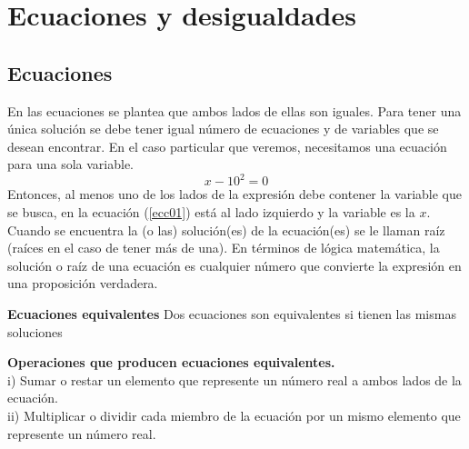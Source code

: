\chapter{Ecuaciones y desigualdades}
\label{EyD}

\section{Ecuaciones}
\label{ecc0}

En las ecuaciones se plantea que ambos lados de ellas son iguales. Para tener una única solución se debe tener igual número de ecuaciones y de variables que se desean encontrar. En el caso particular que veremos, necesitamos una ecuación para una sola variable.\\
\begin{equation}
x-10^{2}=0 \label{ecc01}
\end{equation} 
Entonces, al menos uno de los lados de la expresión debe contener la variable que se busca, en la ecuación (\ref{ecc01}) está al lado izquierdo y la variable es la $x$. Cuando se encuentra la (o las) solución(es) de la ecuación(es) se le llaman raíz (raíces en el caso de tener más de una). En términos de lógica matemática, la solución o raíz de una ecuación es cualquier número que convierte la expresión en una proposición verdadera.\\

\begin{mydef}
\textbf{Ecuaciones equivalentes} Dos ecuaciones son equivalentes si tienen las mismas soluciones
\end{mydef} 

\begin{mydef}
\textbf{Operaciones que producen ecuaciones equivalentes. }\\
\noindent i) Sumar o restar un elemento que represente un número real a ambos lados de la ecuación. \\
\noindent ii) Multiplicar o dividir cada miembro de la ecuación por un mismo elemento que represente un número real.\\
\end{mydef} 

